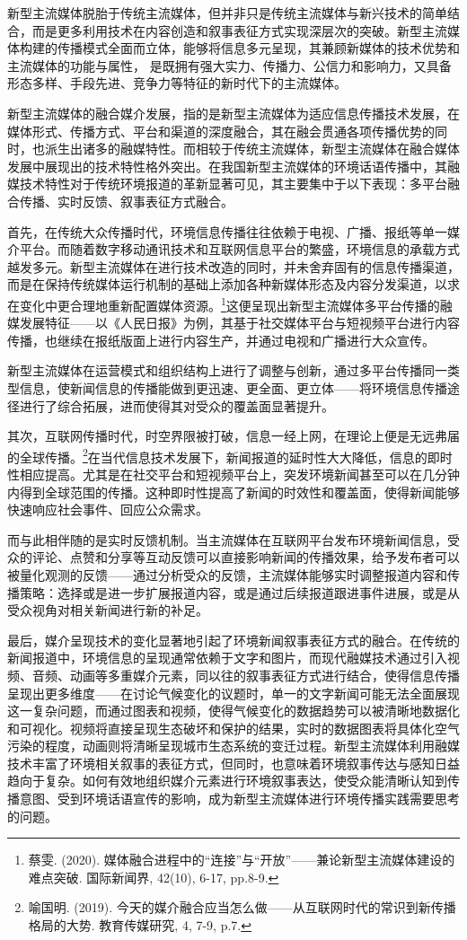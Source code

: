 新型主流媒体脱胎于传统主流媒体，但并非只是传统主流媒体与新兴技术的简单结合，而是更多利用技术在内容创造和叙事表征方式实现深层次的突破。新型主流媒体构建的传播模式全面而立体，能够将信息多元呈现，其兼顾新媒体的技术优势和主流媒体的功能与属性，
是既拥有强大实力、传播力、公信力和影响力，又具备形态多样、手段先进、竞争力等特征的新时代下的主流媒体。

新型主流媒体的融合媒介发展，指的是新型主流媒体为适应信息传播技术发展，在媒体形式、传播方式、平台和渠道的深度融合，其在融会贯通各项传播优势的同时，也派生出诸多的融媒特性。而相较于传统主流媒体，新型主流媒体在融合媒体发展中展现出的技术特性格外突出。在我国新型主流媒体的环境话语传播中，其融媒技术特性对于传统环境报道的革新显著可见，其主要集中于以下表现：多平台融合传播、实时反馈、叙事表征方式融合。

首先，在传统大众传播时代，环境信息传播往往依赖于电视、广播、报纸等单一媒介平台。而随着数字移动通讯技术和互联网信息平台的繁盛，环境信息的承载方式越发多元。新型主流媒体在进行技术改造的同时，并未舍弃固有的信息传播渠道，而是在保持传统媒体运行机制的基础上添加各种新媒体形态及内容分发渠道，以求在变化中更合理地重新配置媒体资源。\footnote{蔡雯.
  (2020).
  媒体融合进程中的``连接''与``开放''------兼论新型主流媒体建设的难点突破.
  国际新闻界, 42(10), 6-17, pp.8-9.}这便呈现出新型主流媒体多平台传播的融媒发展特征------以《人民日报》为例，其基于社交媒体平台与短视频平台进行内容传播，也继续在报纸版面上进行内容生产，并通过电视和广播进行大众宣传。

新型主流媒体在运营模式和组织结构上进行了调整与创新，通过多平台传播同一类型信息，使新闻信息的传播能做到更迅速、更全面、更立体------将环境信息传播途径进行了综合拓展，进而使得其对受众的覆盖面显著提升。

其次，互联网传播时代，时空界限被打破，信息一经上网，在理论上便是无远弗届的全球传播。\footnote{喻国明.
  (2019).
  今天的媒介融合应当怎么做------从互联网时代的常识到新传播格局的大势.
  教育传媒研究, 4, 7-9, p.7.}在当代信息技术发展下，新闻报道的延时性大大降低，信息的即时性相应提高。尤其是在社交平台和短视频平台上，突发环境新闻甚至可以在几分钟内得到全球范围的传播。这种即时性提高了新闻的时效性和覆盖面，使得新闻能够快速响应社会事件、回应公众需求。

而与此相伴随的是实时反馈机制。当主流媒体在互联网平台发布环境新闻信息，受众的评论、点赞和分享等互动反馈可以直接影响新闻的传播效果，给予发布者可以被量化观测的反馈------通过分析受众的反馈，主流媒体能够实时调整报道内容和传播策略：选择或是进一步扩展报道内容，或是通过后续报道跟进事件进展，或是从受众视角对相关新闻进行新的补足。

最后，媒介呈现技术的变化显著地引起了环境新闻叙事表征方式的融合。在传统的新闻报道中，环境信息的呈现通常依赖于文字和图片，而现代融媒技术通过引入视频、音频、动画等多重媒介元素，同以往的叙事表征方式进行结合，使得信息传播呈现出更多维度------在讨论气候变化的议题时，单一的文字新闻可能无法全面展现这一复杂问题，而通过图表和视频，使得气候变化的数据趋势可以被清晰地数据化和可视化。视频将直接呈现生态破坏和保护的结果，实时的数据图表将具体化空气污染的程度，动画则将清晰呈现城市生态系统的变迁过程。新型主流媒体利用融媒技术丰富了环境相关叙事的表征方式，但同时，也意味着环境叙事传达与感知日益趋向于复杂。如何有效地组织媒介元素进行环境叙事表达，使受众能清晰认知到传播意图、受到环境话语宣传的影响，成为新型主流媒体进行环境传播实践需要思考的问题。

